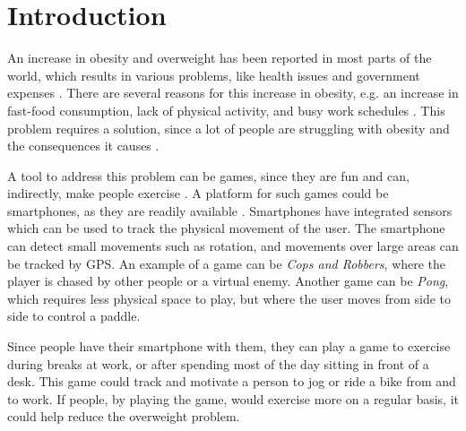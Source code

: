 \chapter{Introduction}\label{chapter:introduction}
An increase in obesity and overweight has been reported in most parts of the world, which results in various problems, like health issues and government expenses \citep{misc:HealthRisks,misc:FedmeKoster}.
There are several reasons for this increase in obesity, e.g. an increase in fast-food consumption, lack of physical activity, and busy work schedules \citep{misc:WhatCausesOverweight,misc:TheLancet}. 
This problem requires a solution, since a lot of people are struggling with obesity and the consequences it causes \citep{misc:Folkesundhed}.

A tool to address this problem can be games, since they are fun and can, indirectly, make people exercise \citep{misc:gamemotivations}.
A platform for such games could be smartphones, as they are readily available \citep{misc:Onbile}. 
Smartphones have integrated sensors which can be used to track the physical movement of the user. 
The smartphone can detect small movements such as rotation, and movements over large areas can be tracked by GPS. 
An example of a game can be \textit{Cops and Robbers}, where the player is chased by other people or a virtual enemy. 
Another game can be \textit{Pong}, which requires less physical space to play, but where the user moves from side to side to control a paddle.

Since people have their smartphone with them, they can play a game to exercise during breaks at work, or after spending most of the day sitting in front of a desk. 
This game could track and motivate a person to jog or ride a bike from and to work. 
If people, by playing the game, would exercise more on a regular basis, it could help reduce the overweight problem.